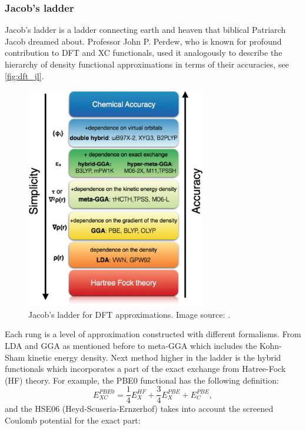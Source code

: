 \subsubsection{Jacob's ladder}
Jacob's ladder is a ladder connecting earth and heaven that biblical Patriarch Jacob dreamed about. Professor John P. Perdew, who is known for profound contribution to DFT and XC functionals, used it analogously to describe the hierarchy of density functional approximations in terms of their accuracies, see \autoref{fig:dft_jl}.  
\begin{figure}[htbp!] 
\centering  
\includegraphics[width=0.7\textwidth]{jacobs.png}
\caption[Jacob's ladder for DFT approximations]{ Jacob's ladder for DFT approximations. Image source: \cite{Peng2016}.}  
\label{fig:dft_jl}
\end{figure} 
Each rung is a level of approximation constructed with different formalisms. From LDA and GGA as mentioned before to meta-GGA which includes the Kohn-Sham kinetic energy density. Next method higher in the ladder is the hybrid functionals which incorporates a part of the exact exchange from Hatree-Fock (HF) theory. For example, the PBE0 functional\cite{Carlo1999} has the following definition:
\begin{equation}
E_{XC}^{PBE0}=\frac{1}{4}E_X^{HF}+\frac{3}{4}E_X^{PBE}+E_C^{PBE},
\end{equation}
and the HSE06 (Heyd-Scuseria-Ernzerhof)\cite{Jochen2003} takes into account the screened Coulomb potential for the exact part:
